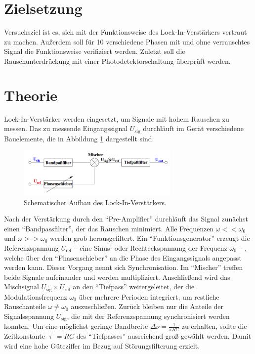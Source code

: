 \section{Zielsetzung}

Versuchsziel ist es, sich mit der Funktionsweise des Lock-In-Verstärkers vertraut zu machen. 
Außerdem soll für 10 verschiedene Phasen mit und ohne verrauschtes Signal die Funktionsweise verifiziert werden. 
Zuletzt soll die Rauschunterdrückung mit einer Photodetektorschaltung überprüft werden.

\section{Theorie}
\label{sec:Theorie}
Lock-In-Verstärker werden eingesetzt, um Signale mit hohem Rauschen zu messen. 
%
Das zu messende Eingangssignal $U_\mathup{sig}$ durchläuft im Gerät verschiedene Bauelemente, die in Abbildung \ref{fig:lockin} dargestellt sind.
\begin{figure}
	\centering
		\includegraphics[width=0.7\textwidth]{Bilder/LOCK_IN.pdf}
		\caption{Schematischer Aufbau des Lock-In-Verstärkers. \cite{V303}}
		\label{fig:lockin}
	\end{figure}

Nach der Verstärkung durch den \enquote{Pre-Amplifier} durchläuft das Signal zunächst einen \enquote{Bandpassfilter}, der das Rauschen minimiert. 
Alle Frequenzen $\omega<<\omega_0$ und $\omega>>\omega_0$ werden grob herausgefiltert.
Ein \enquote{Funktionsgenerator} erzeugt die Referenzspannung $U_\mathup{ref}$ -- eine Sinus- oder Rechteckspannung der Frequenz $\omega_0$ -- , welche über den \enquote{Phasenschieber} an die Phase des Eingangssignals angepasst werden kann. 
Dieser Vorgang nennt sich Synchronisation.
Im \enquote{Mischer} treffen beide Signale aufeinander und werden multipliziert. 
Anschließend wird das Mischsignal $U_\mathup{sig}\times U_\mathup{ref}$ an den \enquote{Tiefpass} weitergeleitet, der die Modulationsfrequenz $\omega_0$ über mehrere Perioden integriert, um restliche Rauschanteile $\omega\neq\omega_0$ auszuschließen. 
Zurück bleiben nur die Anteile der Signalsspannung $U_\mathup{sig}$, die mit der Referenzspannung synchronisiert werden konnten.
Um eine möglichst geringe Bandbreite $\Delta{\nu}=\frac{1}{\pi RC}$ zu erhalten, sollte die Zeitkonstante $\uptau=RC$ des \enquote{Tiefpasses} ausreichend groß gewählt werden. 
Damit wird eine hohe Güteziffer im Bezug auf Störungsfilterung erzielt.

